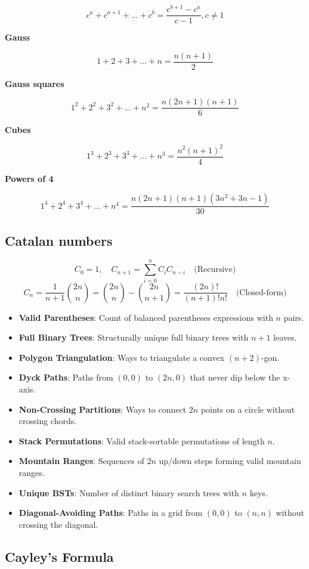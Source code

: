 \documentclass[10pt]{article}
\begin{document}
\begin{multicols*}{2}
\[
c^a+c^{a+1}+\dots + c^b = \frac{c^{b+1}-c^a}{c-1}, c\neq 1
\]

\textbf{Gauss}

\[
1+2+3+...+n = \frac{n(n+1)}{2}
\]

\textbf{Gauss squares}

\[
1^2+2^2+3^2+...+n^2 = \frac{n(2n+1)(n+1)}{6}
\]

\textbf{Cubes}

\[
1^3+2^3+3^3+...+n^3 = \frac{n^2(n+1)^2}{4}
\]

\textbf{Powers of 4}

\[
1^4+2^4+3^4+...+n^4 = \frac{n(2n+1)(n+1)(3n^2+3n-1)}{30}
\]

\subsection{Catalan numbers}
\[
C_0 = 1, \quad C_{n+1} = \sum_{i=0}^{n} C_i C_{n-i} \quad \text{(Recursive)}
\]
\[
C_n = \frac{1}{n+1} \binom{2n}{n} = \binom{2n}{n} - \binom{2n}{n+1} = \frac{(2n)!}{(n+1)!n!} \quad \text{(Closed-form)}
\]

\begin{itemize}
    \item \textbf{Valid Parentheses}: Count of balanced parentheses expressions with \( n \) pairs.
    \item \textbf{Full Binary Trees}: Structurally unique full binary trees with \( n+1 \) leaves.
    \item \textbf{Polygon Triangulation}: Ways to triangulate a convex \( (n+2) \)-gon.
    \item \textbf{Dyck Paths}: Paths from \( (0,0) \) to \( (2n,0) \) that never dip below the x-axis.
    \item \textbf{Non-Crossing Partitions}: Ways to connect \( 2n \) points on a circle without crossing chords.
    \item \textbf{Stack Permutations}: Valid stack-sortable permutations of length \( n \).
    \item \textbf{Mountain Ranges}: Sequences of \( 2n \) up/down steps forming valid mountain ranges.
    \item \textbf{Unique BSTs}: Number of distinct binary search trees with \( n \) keys.
    \item \textbf{Diagonal-Avoiding Paths}: Paths in a grid from \( (0,0) \) to \( (n,n) \) without crossing the diagonal.
\end{itemize}

\subsection{Cayley's Formula}


\end{multicols*}
\end{document}
